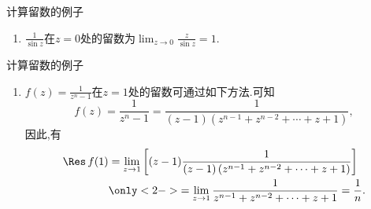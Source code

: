 \documentclass[fontset=windows, chinese, 10pt]{beamer}
\begin{document}
\begin{frame}{计算留数的例子}
  \small
\begin{solution}
    \begin{enumerate}
        \item $\frac{1}{\sin z}$在$z=0$处的留数为$\lim_{z\to 0} \frac{z}{\sin{z}} = 1$.

    \end{enumerate}
\end{solution}
\end{frame}

\begin{frame}{计算留数的例子}
  \begin{solution}
\begin{enumerate}
    \item $f(z) = \frac{1}{z^n - 1}$在$z=1$处的留数可通过如下方法.可知
        $$
          f(z)=\frac{1}{z^n-1}=\frac{1}{(z-1)\left(z^{n-1}+z^{n-2}+\cdots+z+1\right)},
        $$
        因此,有
        $$
          \begin{aligned}
             \operatorname{\Res} f(1) & =\lim _{z \to 1}\left[(z-1) \frac{1}{(z-1)\left(z^{n-1}+z^{n-2}+\cdots+z+1\right)}\right] \\
             & 
            \only<2->{=\lim _{z \to 1} \frac{1}{z^{n-1}+z^{n-2}+\cdots+z+1}=\frac{1}{n} .}
          \end{aligned}
        $$

\end{enumerate}
\end{solution}
\end{frame}
\end{document}
